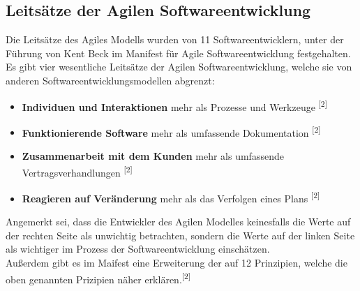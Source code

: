 \documentclass[a4paper, 10pt]{scrartcl}
\begin{document}
\subsection{Leitsätze der Agilen Softwareentwicklung}
Die Leitsätze des Agiles Modells wurden von 11 Softwareentwicklern, unter der \\Führung von Kent Beck im \glqq{}Manifest für Agile Softwareentwicklung\grqq{} festgehalten. Es gibt vier wesentliche Leitsätze der Agilen Softwareentwicklung, welche sie von \\anderen Softwareentwicklungsmodellen abgrenzt:
\begin{itemize}
\item \glqq{}\textbf{Individuen und Interaktionen} mehr als Prozesse und Werkzeuge\grqq{} \textsuperscript{[2]} 
\item \glqq{}\textbf{Funktionierende Software} mehr als umfassende Dokumentation\grqq{} \textsuperscript{[2]}
\item \glqq{}\textbf{Zusammenarbeit mit dem Kunden} mehr als umfassende Vertragsverhandlungen\grqq{} \textsuperscript{[2]}
\item \glqq{}\textbf{Reagieren auf Veränderung} mehr als das Verfolgen eines Plans\grqq{} \textsuperscript{[2]}
\end{itemize}
Angemerkt sei, dass die Entwickler des Agilen Modelles keinesfalls die Werte auf der rechten Seite als unwichtig betrachten, sondern die Werte auf der linken Seite als wichtiger im Prozess der Softwareentwicklung einschätzen.\\
Außerdem gibt es im Maifest eine Erweiterung der auf 12 Prinzipien, welche die oben genannten Prizipien näher erklären.\textsuperscript{[2]} 
\end{document}

